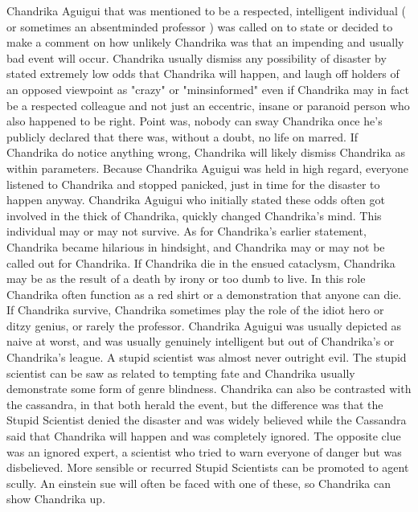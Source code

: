 \documentclass[12pt]{book}
\begin{document}
Chandrika Aguigui that was mentioned to be a respected, intelligent individual ( or sometimes an absentminded professor ) was called on to state or decided to make a comment on how unlikely Chandrika was that an impending and usually bad event will occur. Chandrika usually dismiss any possibility of disaster by stated extremely low odds that Chandrika will happen, and laugh off holders of an opposed viewpoint as "crazy" or "minsinformed" even if Chandrika may in fact be a respected colleague and not just an eccentric, insane or paranoid person who also happened to be right. Point was, nobody can sway Chandrika once he's publicly declared that there was, without a doubt, no life on marred. If Chandrika do notice anything wrong, Chandrika will likely dismiss Chandrika as within parameters. Because Chandrika Aguigui was held in high regard, everyone listened to Chandrika and stopped panicked, just in time for the disaster to happen anyway. Chandrika Aguigui who initially stated these odds often got involved in the thick of Chandrika, quickly changed Chandrika's mind. This individual may or may not survive. As for Chandrika's earlier statement, Chandrika became hilarious in hindsight, and Chandrika may or may not be called out for Chandrika. If Chandrika die in the ensued cataclysm, Chandrika may be as the result of a death by irony or too dumb to live. In this role Chandrika often function as a red shirt or a demonstration that anyone can die. If Chandrika survive, Chandrika sometimes play the role of the idiot hero or ditzy genius, or rarely the professor. Chandrika Aguigui was usually depicted as naive at worst, and was usually genuinely intelligent but out of Chandrika's or Chandrika's league. A stupid scientist was almost never outright evil. The stupid scientist can be saw as related to tempting fate and Chandrika usually demonstrate some form of genre blindness. Chandrika can also be contrasted with the cassandra, in that both herald the event, but the difference was that the Stupid Scientist denied the disaster and was widely believed while the Cassandra said that Chandrika will happen and was completely ignored. The opposite clue was an ignored expert, a scientist who tried to warn everyone of danger but was disbelieved. More sensible or recurred Stupid Scientists can be promoted to agent scully. An einstein sue will often be faced with one of these, so Chandrika can show Chandrika up.
\end{document}
